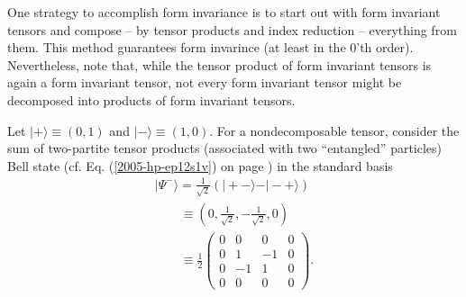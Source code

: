 One strategy to accomplish  form invariance  is to start out with form invariant
tensors and compose -- by tensor products and index reduction -- everything from them. This method guarantees form
invarince (at least in the 0'th order).
Nevertheless, note that, while the tensor product of form invariant tensors is again a form invariant tensor,  not every form
invariant tensor might be decomposed into products of form invariant tensors.

{
\color{blue}
\bexample
Let
$\vert + \rangle  \equiv   (0,1)$
and
$\vert - \rangle  \equiv   (1,0)$.
For a nondecomposable tensor, consider the sum of two-partite tensor products (associated with two ``entangled'' particles)
Bell state (cf. Eq. (\ref{2005-hp-ep12s1v}) on page \pageref{2005-hp-ep12s1v}) in the standard basis     
\begin{equation}
\begin{array}{l}
\vert \Psi^-\rangle = \frac{1}{\sqrt{2}}\left(\vert +-\rangle   - \vert -+\rangle  \right)   \\
\qquad \equiv  \left( 0,\frac{1}{\sqrt{2}},- \frac{1}{\sqrt{2}} ,  0 \right)     \\
\qquad \equiv  \frac{1}{2}
 \left(
\begin{array}{rrrr}
0&0&0&0\\
0&1&-1&0\\
0&-1&1&0\\
0&0&0&0
\end{array}
\right)
.
\end{array}
\label{2011-m-bellstatenondec}
\end{equation}

}
